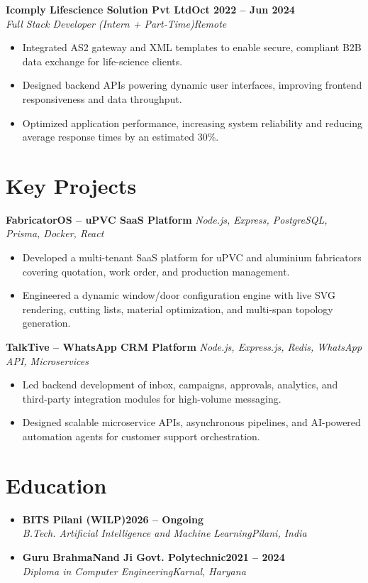 \documentclass[10pt,a4paper]{article}
\newcommand{\role}[4]{%
  \textbf{#1}\hfill\textbf{#3}\\
  \textit{#2}\hfill\textit{#4}\vspace{2pt}%
}
\newcommand{\resumeSubHeadingListStart}{\begin{itemize}[leftmargin=0pt,label={},itemsep=4pt,topsep=2pt]}
\newcommand{\resumeSubHeadingListEnd}{\end{itemize}}
\newcommand{\resumeSubheading}[4]{%
  \item \textbf{#1}\hfill\textbf{#2}\\
  \textit{#3}\hfill\textit{#4}\vspace{2pt}%
}
\begin{document}
\role{Icomply Lifescience Solution Pvt Ltd}{Full Stack Developer (Intern + Part-Time)}{Oct 2022 -- Jun 2024}{Remote}
\begin{itemize}
  \item Integrated AS2 gateway and XML templates to enable secure, compliant B2B data exchange for life-science clients.
  \item Designed backend APIs powering dynamic user interfaces, improving frontend responsiveness and data throughput.
  \item Optimized application performance, increasing system reliability and reducing average response times by an estimated 30\%.
\end{itemize}

\section{Key Projects}
\textbf{FabricatorOS -- uPVC SaaS Platform} \hfill \textit{Node.js, Express, PostgreSQL, Prisma, Docker, React}
\begin{itemize}
  \item Developed a multi-tenant SaaS platform for uPVC and aluminium fabricators covering quotation, work order, and production management.
  \item Engineered a dynamic window/door configuration engine with live SVG rendering, cutting lists, material optimization, and multi-span topology generation.
\end{itemize}

\textbf{TalkTive -- WhatsApp CRM Platform} \hfill \textit{Node.js, Express.js, Redis, WhatsApp API, Microservices}
\begin{itemize}
  \item Led backend development of inbox, campaigns, approvals, analytics, and third-party integration modules for high-volume messaging.
  \item Designed scalable microservice APIs, asynchronous pipelines, and AI-powered automation agents for customer support orchestration.
\end{itemize}

\section{Education}
  \resumeSubHeadingListStart
   \resumeSubheading
      {BITS Pilani (WILP)}{2026 -- Ongoing}
      {B.Tech. Artificial Intelligence and Machine Learning}{Pilani, India}
   \resumeSubheading
      {Guru BrahmaNand Ji Govt. Polytechnic}{2021 -- 2024}
      {Diploma in Computer Engineering}{Karnal, Haryana}
  \resumeSubHeadingListEnd
\end{document}
